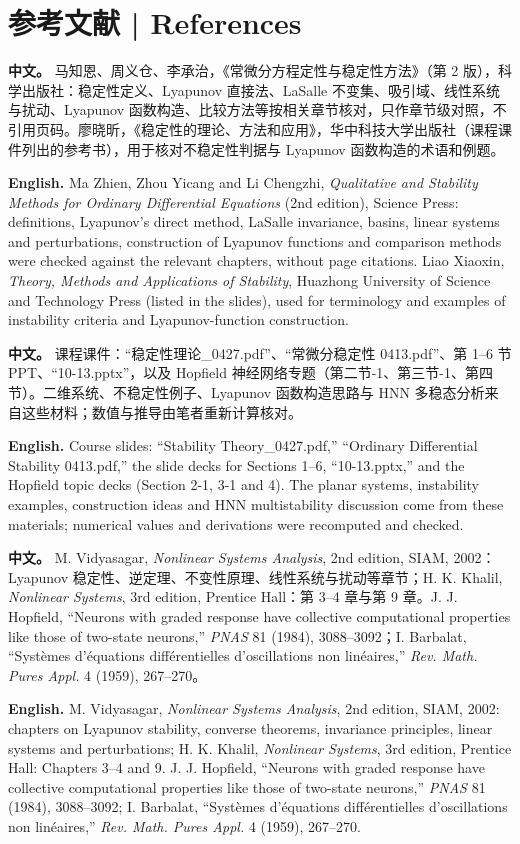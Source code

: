 \documentclass[UTF8,11pt,a4paper]{ctexart}
\newcommand{\APS}[2]{\par\noindent\textbf{中文。} #1\par\noindent\textbf{English.} #2\par}
\begin{document}
\section*{参考文献 | References}
\APS{马知恩、周义仓、李承治，《常微分方程定性与稳定性方法》（第 2 版），科学出版社：稳定性定义、Lyapunov 直接法、LaSalle 不变集、吸引域、线性系统与扰动、Lyapunov 函数构造、比较方法等按相关章节核对，只作章节级对照，不引用页码。廖晓昕，《稳定性的理论、方法和应用》，华中科技大学出版社（课程课件列出的参考书），用于核对不稳定性判据与 Lyapunov 函数构造的术语和例题。}{Ma Zhien, Zhou Yicang and Li Chengzhi, \emph{Qualitative and Stability Methods for Ordinary Differential Equations} (2nd edition), Science Press: definitions, Lyapunov's direct method, LaSalle invariance, basins, linear systems and perturbations, construction of Lyapunov functions and comparison methods were checked against the relevant chapters, without page citations. Liao Xiaoxin, \emph{Theory, Methods and Applications of Stability}, Huazhong University of Science and Technology Press (listed in the slides), used for terminology and examples of instability criteria and Lyapunov-function construction.}
\APS{课程课件：“稳定性理论\_0427.pdf”、“常微分稳定性 0413.pdf”、第 1--6 节 PPT、“10-13.pptx”，以及 Hopfield 神经网络专题（第二节-1、第三节-1、第四节）。二维系统、不稳定性例子、Lyapunov 函数构造思路与 HNN 多稳态分析来自这些材料；数值与推导由笔者重新计算核对。}{Course slides: “Stability Theory\_0427.pdf,” “Ordinary Differential Stability 0413.pdf,” the slide decks for Sections 1--6, “10-13.pptx,” and the Hopfield topic decks (Section 2-1, 3-1 and 4). The planar systems, instability examples, construction ideas and HNN multistability discussion come from these materials; numerical values and derivations were recomputed and checked.}
\APS{M. Vidyasagar, \emph{Nonlinear Systems Analysis}, 2nd edition, SIAM, 2002：Lyapunov 稳定性、逆定理、不变性原理、线性系统与扰动等章节；H. K. Khalil, \emph{Nonlinear Systems}, 3rd edition, Prentice Hall：第 3--4 章与第 9 章。J. J. Hopfield, “Neurons with graded response have collective computational properties like those of two-state neurons,” \emph{PNAS} 81 (1984), 3088--3092；I. Barbalat, “Syst\`emes d'\'equations diff\'erentielles d'oscillations non lin\'eaires,” \emph{Rev. Math. Pures Appl.} 4 (1959), 267--270。}{M. Vidyasagar, \emph{Nonlinear Systems Analysis}, 2nd edition, SIAM, 2002: chapters on Lyapunov stability, converse theorems, invariance principles, linear systems and perturbations; H. K. Khalil, \emph{Nonlinear Systems}, 3rd edition, Prentice Hall: Chapters 3--4 and 9. J. J. Hopfield, “Neurons with graded response have collective computational properties like those of two-state neurons,” \emph{PNAS} 81 (1984), 3088--3092; I. Barbalat, “Syst\`emes d'\'equations diff\'erentielles d'oscillations non lin\'eaires,” \emph{Rev. Math. Pures Appl.} 4 (1959), 267--270.}
\end{document}
